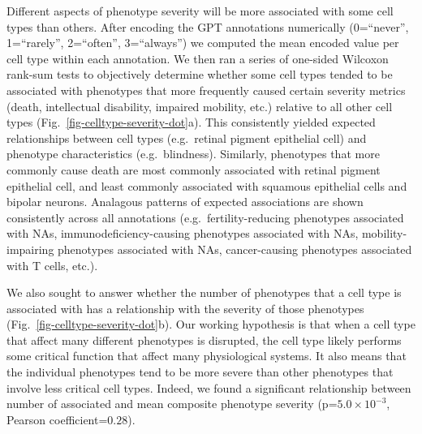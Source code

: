 \documentclass[
]{article}
\begin{document}
Different aspects of phenotype severity will be more associated with
some cell types than others. After encoding the GPT annotations
numerically (0=``never'', 1=``rarely'', 2=``often'', 3=``always'') we
computed the mean encoded value per cell type within each annotation. We
then ran a series of one-sided Wilcoxon rank-sum tests to objectively
determine whether some cell types tended to be associated with
phenotypes that more frequently caused certain severity metrics (death,
intellectual disability, impaired mobility, etc.) relative to all other
cell types (Fig.~\ref{fig-celltype-severity-dot}a). This consistently
yielded expected relationships between cell types (e.g.~retinal pigment
epithelial cell) and phenotype characteristics (e.g.~blindness).
Similarly, phenotypes that more commonly cause death are most commonly
associated with retinal pigment epithelial cell, and least commonly
associated with squamous epithelial cells and bipolar neurons. Analagous
patterns of expected associations are shown consistently across all
annotations (e.g.~fertility-reducing phenotypes associated with NAs,
immunodeficiency-causing phenotypes associated with NAs,
mobility-impairing phenotypes associated with NAs, cancer-causing
phenotypes associated with T cells, etc.).

We also sought to answer whether the number of phenotypes that a cell
type is associated with has a relationship with the severity of those
phenotypes (Fig.~\ref{fig-celltype-severity-dot}b). Our working
hypothesis is that when a cell type that affect many different
phenotypes is disrupted, the cell type likely performs some critical
function that affect many physiological systems. It also means that the
individual phenotypes tend to be more severe than other phenotypes that
involve less critical cell types. Indeed, we found a significant
relationship between number of associated and mean composite phenotype
severity (p=\(5.0 \times 10^{-3}\), Pearson coefficient=\(0.28\)).
\end{document}
